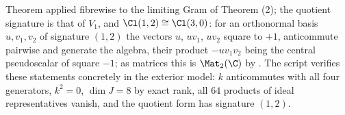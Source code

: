 Theorem  applied fibrewise to the limiting Gram of Theorem (2); the quotient signature is that of $V_1$, and $\Cl(1,2) \cong \Cl(3,0)$: for an orthonormal basis $u, v_{1}, v_{2}$ of signature $(1,2)$ the vectors $u$, $uv_{1}$, $uv_{2}$ square to $+1$, anticommute pairwise and generate the algebra, their product $-uv_{1}v_{2}$ being the central pseudoscalar of square $-1$; as matrices this is $\Mat_2(\C)$ by . The script verifies these statements concretely in the exterior model: $k$ anticommutes with all four generators, $k^2 = 0$, $\dim J = 8$ by exact rank, all $64$ products of ideal representatives vanish, and the quotient form has signature $(1,2)$.
